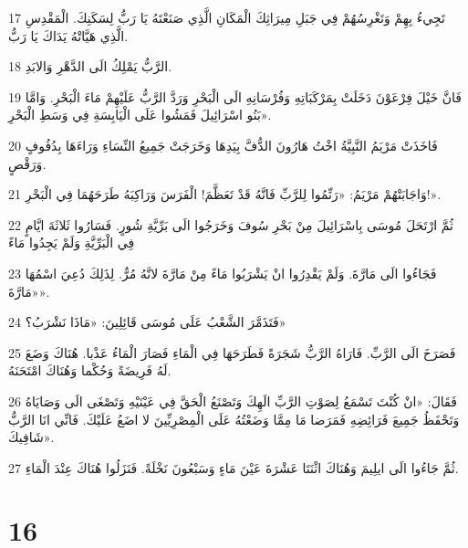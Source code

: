 \par 17 تَجِيءُ بِهِمْ وَتَغْرِسُهُمْ فِي جَبَلِ مِيرَاثِكَ الْمَكَانِ الَّذِي صَنَعْتَهُ يَا رَبُّ لِسَكَنِكَ. الْمَقْدِسِ الَّذِي هَيَّاتْهُ يَدَاكَ يَا رَبُّ.
\par 18 الرَّبُّ يَمْلِكُ الَى الدَّهْرِ وَالابَدِ.
\par 19 فَانَّ خَيْلَ فِرْعَوْنَ دَخَلَتْ بِمَرْكَبَاتِهِ وَفُرْسَانِهِ الَى الْبَحْرِ وَرَدَّ الرَّبُّ عَلَيْهِمْ مَاءَ الْبَحْرِ. وَامَّا بَنُو اسْرَائِيلَ فَمَشُوا عَلَى الْيَابِسَةِ فِي وَسَطِ الْبَحْرِ».
\par 20 فَاخَذَتْ مَرْيَمُ النَّبِيَّةُ اخْتُ هَارُونَ الدُّفَّ بِيَدِهَا وَخَرَجَتْ جَمِيعُ النِّسَاءِ وَرَاءَهَا بِدُفُوفٍ وَرَقْصٍ.
\par 21 وَاجَابَتْهُمْ مَرْيَمُ: «رَنِّمُوا لِلرَّبِّ فَانَّهُ قَدْ تَعَظَّمَ! الْفَرَسَ وَرَاكِبَهُ طَرَحَهُمَا فِي الْبَحْرِ!».
\par 22 ثُمَّ ارْتَحَلَ مُوسَى بِاسْرَائِيلَ مِنْ بَحْرِ سُوفَ وَخَرَجُوا الَى بَرِّيَّةِ شُورٍ. فَسَارُوا ثَلاثَةَ ايَّامٍ فِي الْبَرِّيَّةِ وَلَمْ يَجِدُوا مَاءً
\par 23 فَجَاءُوا الَى مَارَّةَ. وَلَمْ يَقْدِرُوا انْ يَشْرَبُوا مَاءً مِنْ مَارَّةَ لانَّهُ مُرٌّ. لِذَلِكَ دُعِيَ اسْمُهَا «مَارَّةَ».
\par 24 فَتَذَمَّرَ الشَّعْبُ عَلَى مُوسَى قَائِلِينَ: «مَاذَا نَشْرَبُ؟»
\par 25 فَصَرَخَ الَى الرَّبِّ. فَارَاهُ الرَّبُّ شَجَرَةً فَطَرَحَهَا فِي الْمَاءِ فَصَارَ الْمَاءُ عَذْبا. هُنَاكَ وَضَعَ لَهُ فَرِيضَةً وَحُكْما وَهُنَاكَ امْتَحَنَهُ.
\par 26 فَقَالَ: «انْ كُنْتَ تَسْمَعُ لِصَوْتِ الرَّبِّ الَهِكَ وَتَصْنَعُ الْحَقَّ فِي عَيْنَيْهِ وَتَصْغَى الَى وَصَايَاهُ وَتَحْفَظُ جَمِيعَ فَرَائِضِهِ فَمَرَضا مَا مِمَّا وَضَعْتُهُ عَلَى الْمِصْرِيِّينَ لا اضَعُ عَلَيْكَ. فَانِّي انَا الرَّبُّ شَافِيكَ».
\par 27 ثُمَّ جَاءُوا الَى ايلِيمَ وَهُنَاكَ اثْنَتَا عَشْرَةَ عَيْنَ مَاءٍ وَسَبْعُونَ نَخْلَةً. فَنَزَلُوا هُنَاكَ عِنْدَ الْمَاءِ.

\chapter{16}

